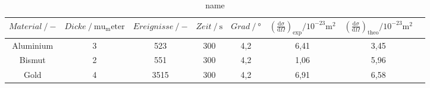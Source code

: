 \begin{table}[H] 
   \centering 
   \caption{name} 
   \label{tab:name} 
   \begin{tabular} { c c c c c c c c } 
 \toprule 
 {$Material\:/\: \mathrm{-}$}  & {$Dicke\:/\: \mathrm{mu_meter}$} & {$Ereignisse\:/\: \mathrm{-}$} & {$Zeit\:/\: \mathrm{s}$} & {$Grad\:/\: \mathrm{°}$} & {$\left(\frac{\mathrm{d}\sigma}{\mathrm{d}\Omega}\right)_\text{exp}/10^{-23}\si{\meter^2}$} & {$\left(\frac{\mathrm{d}\sigma}{\mathrm{d}\Omega}\right)_\text{theo}/10^{-23}\si{\meter^2}$}\\ 
    \midrule 
    Aluminium & 3 & 523 & 300 & 4,2 & 6,41 & 3,45 \\ 
    Bismut & 2 & 551 & 300 & 4,2 & 1,06 & 5,96  \\ 
    Gold & 4 & 3515 & 300 & 4,2  & 6,91 & 6,58 \\ 
    \bottomrule 
  \end{tabular}
\end{table}
